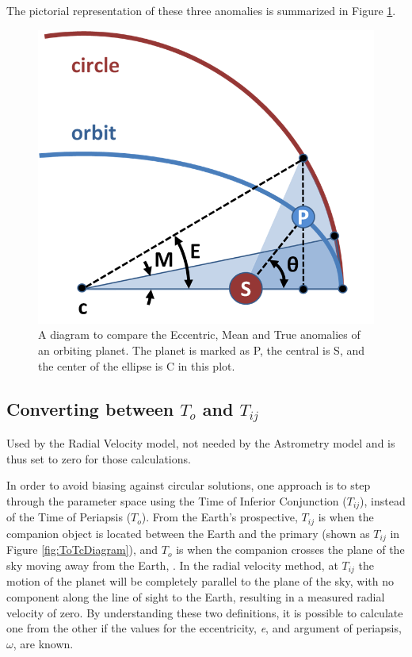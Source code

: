 \documentclass[12pt,preprint]{aastex}
\begin{document}
The pictorial representation of these three anomalies is summarized in Figure \ref{fig:Anomalies}.

\begin{figure}[ht]
\begin{center}
\includegraphics[scale=0.4]{Figures/Anomalies-MOD.png}
\caption[Diagram of Anomalies]{A diagram to compare the Eccentric, Mean and True anomalies of an orbiting planet.  The planet is marked as P, the central is S, and the center of the ellipse is C in this plot. }
\label{fig:Anomalies}
\end{center}
\end{figure}
\subsection{Converting between $T_o$ and $T_{ij}$}\label{sec:ToTcCalculator}

Used by the Radial Velocity model, not needed by the Astrometry model and is thus set to zero for those calculations.

In order to avoid biasing against circular solutions, one approach is to step through the parameter space using the Time of Inferior Conjunction ($T_{ij}$), instead of the Time of Periapsis ($T_o$).  From the Earth's prospective, $T_{ij}$ is when the companion object is located between the Earth and the primary (shown as {\color{green}$T_{ij}$} in Figure \ref{fig:ToTcDiagram}), and $T_o$ is when the companion crosses the plane of the sky moving away from the Earth, \citep{heintz}.  In the radial velocity method, at $T_{ij}$ the motion of the planet will be completely parallel to the plane of the sky, with no component along the line of sight to the Earth, resulting in a measured radial velocity of zero.  By understanding these two definitions, it is possible to calculate one from the other if the values for the eccentricity, {\it e}, and argument of periapsis, $\omega$, are known.
\end{document}
